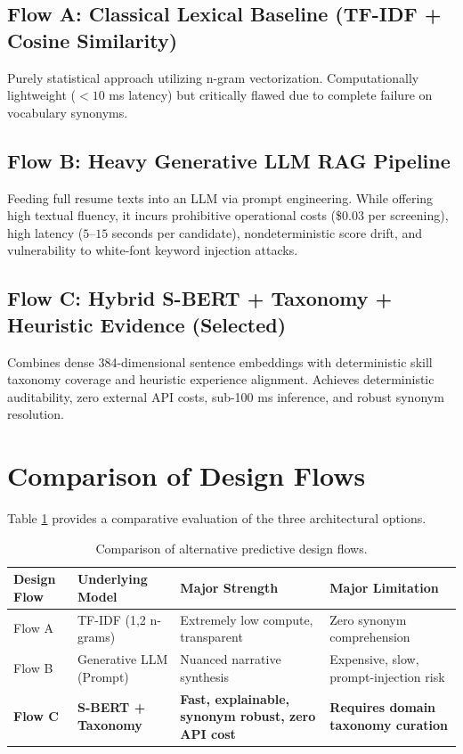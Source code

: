 \documentclass[12pt,a4paper]{report}
\begin{document}
\subsection{Flow A: Classical Lexical Baseline (TF-IDF + Cosine Similarity)}
Purely statistical approach utilizing n-gram vectorization. Computationally lightweight ($<10$ ms latency) but critically flawed due to complete failure on vocabulary synonyms.

\subsection{Flow B: Heavy Generative LLM RAG Pipeline}
Feeding full resume texts into an LLM via prompt engineering. While offering high textual fluency, it incurs prohibitive operational costs (\$0.03 per screening), high latency ($5$--$15$ seconds per candidate), nondeterministic score drift, and vulnerability to white-font keyword injection attacks.

\subsection{Flow C: Hybrid S-BERT + Taxonomy + Heuristic Evidence (Selected)}
Combines dense 384-dimensional sentence embeddings with deterministic skill taxonomy coverage and heuristic experience alignment. Achieves deterministic auditability, zero external API costs, sub-100 ms inference, and robust synonym resolution.

\section{Comparison of Design Flows}
Table \ref{tab:design_flow_comparison} provides a comparative evaluation of the three architectural options.

\begin{table}[h!]
\centering
\caption{Comparison of alternative predictive design flows.}
\label{tab:design_flow_comparison}
\begin{tabular}{|p{2.5cm}|p{3.5cm}|p{4.5cm}|p{3.5cm}|}
\hline
\textbf{Design Flow} & \textbf{Underlying Model} & \textbf{Major Strength} & \textbf{Major Limitation} \\ \hline
Flow A & TF-IDF (1,2 n-grams) & Extremely low compute, transparent & Zero synonym comprehension \\ \hline
Flow B & Generative LLM (Prompt) & Nuanced narrative synthesis & Expensive, slow, prompt-injection risk \\ \hline
\textbf{Flow C} & \textbf{S-BERT + Taxonomy} & \textbf{Fast, explainable, synonym robust, zero API cost} & \textbf{Requires domain taxonomy curation} \\ \hline
\end{tabular}
\end{table}
\end{document}
